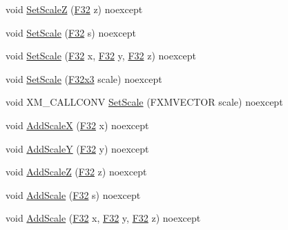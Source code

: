 \begin{DoxyCompactItemize}
\item 
void \mbox{\hyperlink{classmage_1_1_local_transform_a076673ed934cc2b92febfd5477e81e75}{Set\+ScaleZ}} (\mbox{\hyperlink{namespacemage_aa97e833b45f06d60a0a9c4fc22ae02c0}{F32}} z) noexcept
\item 
void \mbox{\hyperlink{classmage_1_1_local_transform_ae5940b8381188b25b164322d0c848fb3}{Set\+Scale}} (\mbox{\hyperlink{namespacemage_aa97e833b45f06d60a0a9c4fc22ae02c0}{F32}} s) noexcept
\item 
void \mbox{\hyperlink{classmage_1_1_local_transform_a81b531b924652a52a49a5163ee5f6685}{Set\+Scale}} (\mbox{\hyperlink{namespacemage_aa97e833b45f06d60a0a9c4fc22ae02c0}{F32}} x, \mbox{\hyperlink{namespacemage_aa97e833b45f06d60a0a9c4fc22ae02c0}{F32}} y, \mbox{\hyperlink{namespacemage_aa97e833b45f06d60a0a9c4fc22ae02c0}{F32}} z) noexcept
\item 
void \mbox{\hyperlink{classmage_1_1_local_transform_a8e489c87ad55a7a39a5ec72cc878700b}{Set\+Scale}} (\mbox{\hyperlink{namespacemage_a1e3c7a882af461f161caa1cbddaf1fa2}{F32x3}} scale) noexcept
\item 
void X\+M\+\_\+\+C\+A\+L\+L\+C\+O\+NV \mbox{\hyperlink{classmage_1_1_local_transform_a2f8086f72f3c72a641db1b59e8b3e9c0}{Set\+Scale}} (F\+X\+M\+V\+E\+C\+T\+OR scale) noexcept
\item 
void \mbox{\hyperlink{classmage_1_1_local_transform_a5b3bdbe95a1b531271a122d1fe26f0a6}{Add\+ScaleX}} (\mbox{\hyperlink{namespacemage_aa97e833b45f06d60a0a9c4fc22ae02c0}{F32}} x) noexcept
\item 
void \mbox{\hyperlink{classmage_1_1_local_transform_abd8826a904947b5934ba6afef3b3826f}{Add\+ScaleY}} (\mbox{\hyperlink{namespacemage_aa97e833b45f06d60a0a9c4fc22ae02c0}{F32}} y) noexcept
\item 
void \mbox{\hyperlink{classmage_1_1_local_transform_a28160bebf308eec45d9649a197d91336}{Add\+ScaleZ}} (\mbox{\hyperlink{namespacemage_aa97e833b45f06d60a0a9c4fc22ae02c0}{F32}} z) noexcept
\item 
void \mbox{\hyperlink{classmage_1_1_local_transform_a7c7c84c097157d87bcd3c1d58fc6f8df}{Add\+Scale}} (\mbox{\hyperlink{namespacemage_aa97e833b45f06d60a0a9c4fc22ae02c0}{F32}} s) noexcept
\item 
void \mbox{\hyperlink{classmage_1_1_local_transform_a8de03038d4455846983ccf5b7a0cb08d}{Add\+Scale}} (\mbox{\hyperlink{namespacemage_aa97e833b45f06d60a0a9c4fc22ae02c0}{F32}} x, \mbox{\hyperlink{namespacemage_aa97e833b45f06d60a0a9c4fc22ae02c0}{F32}} y, \mbox{\hyperlink{namespacemage_aa97e833b45f06d60a0a9c4fc22ae02c0}{F32}} z) noexcept

\end{DoxyCompactItemize}
